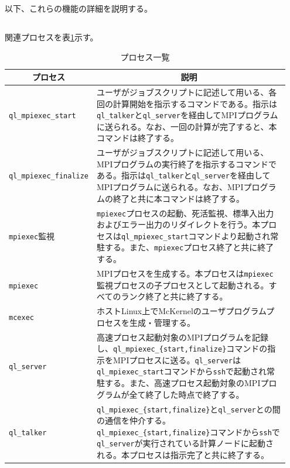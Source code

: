\documentclass[twoside,11pt,fleqn]{book}
\begin{document}
以下、これらの機能の詳細を説明する。

\subsection{}

関連プロセスを表\ref{tab:qlprocess}示す。
\begin{table}[!ht]
\footnotesize
\caption{プロセス一覧}\vspace{0.0em}
\label{tab:qlprocess}
\begin{tabular}{|p{0.20\linewidth}|p{0.75\linewidth}|} \hline
\multicolumn{1}{|c|}{\textbf{プロセス}}&\multicolumn{1}{c|}{\textbf{説明}}\\ \hline 
 \hline
\texttt{ql\_mpiexec\_start}&ユーザがジョブスクリプトに記述して用いる、各回の計算開始を指示するコマンドである。指示は\texttt{ql\_talker}と\texttt{ql\_server}を経由してMPIプログラムに送られる。なお、一回の計算が完了すると、本コマンドは終了する。\\ \hline
\texttt{ql\_mpiexec\_finalize}&ユーザがジョブスクリプトに記述して用いる、MPIプログラムの実行終了を指示するコマンドである。指示は\texttt{ql\_talker}と\texttt{ql\_server}を経由してMPIプログラムに送られる。なお、MPIプログラムの終了と共に本コマンドは終了する。\\ \hline
\texttt{mpiexec}監視&\texttt{mpiexec}プロセスの起動、死活監視、標準入出力およびエラー出力のリダイレクトを行う。本プロセスは\texttt{ql\_mpiexec\_start}コマンドより起動され常駐する。また、\texttt{mpiexec}プロセス終了と共に終了する。\\ \hline
\texttt{mpiexec}&MPIプロセスを生成する。本プロセスは\texttt{mpiexec}監視プロセスの子プロセスとして起動される。すべてのランク終了と共に終了する。\\ \hline
\texttt{mcexec}&ホストLinux上でMcKernelのユーザプログラムプロセスを生成・管理する。\\ \hline
\texttt{ql\_server}&高速プロセス起動対象のMPIプログラムを記録し、\texttt{ql\_mpiexec\_\{start,finalize\}}コマンドの指示をMPIプロセスに送る。\texttt{ql\_server}は\texttt{ql\_mpiexec\_start}コマンドから\texttt{ssh}で起動され常駐する。また、高速プロセス起動対象のMPIプログラムが全て終了した時点で終了する。\\ \hline
\texttt{ql\_talker}&\texttt{ql\_mpiexec\_\{start,finalize\}}と\texttt{ql\_server}との間の通信を仲介する。\texttt{ql\_mpiexec\_\{start,finalize\}}コマンドから\texttt{ssh}で\texttt{ql\_server}が実行されている計算ノードに起動される。本プロセスは指示完了と共に終了する。\\ \hline
\end{tabular}
\vspace{-0em}
\end{table}
\FloatBarrier
\end{document}
